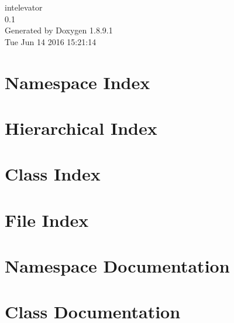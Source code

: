 \documentclass[twoside]{book}
\newcommand{\+}{\discretionary{\mbox{\scriptsize$\hookleftarrow$}}{}{}}
\newcommand{\clearemptydoublepage}{%
  \newpage{\pagestyle{empty}\cleardoublepage}%
}
\begin{document}
\begin{titlepage}
\vspace*{7cm}
\begin{center}%
{\Large intelevator \\[1ex]\large 0.\+1 }\\
\vspace*{1cm}
{\large Generated by Doxygen 1.8.9.1}\\
\vspace*{0.5cm}
{\small Tue Jun 14 2016 15:21:14}\\
\end{center}
\end{titlepage}
\clearemptydoublepage
\tableofcontents
\clearemptydoublepage
{}

\chapter{Namespace Index}

\chapter{Hierarchical Index}

\chapter{Class Index}

\chapter{File Index}

\chapter{Namespace Documentation}


\chapter{Class Documentation}




































\end{document}

